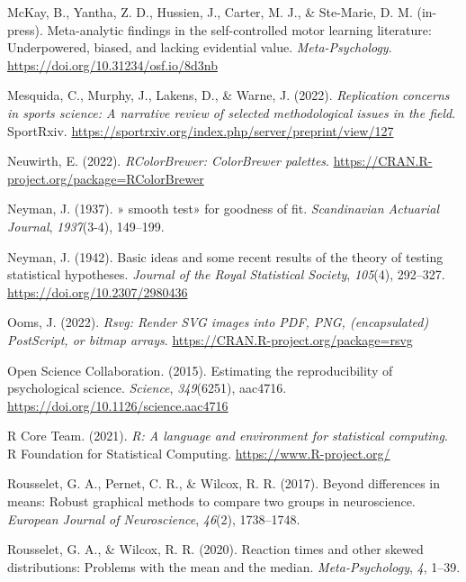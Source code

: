 \documentclass[
  man, donotrepeattitle,mask,floatsintext]{apa7}
\newlength{\cslhangindent}
\newlength{\cslentryspacingunit} %
\newenvironment{CSLReferences}[2] %
 {%
  \setlength{\parindent}{0pt}
  \ifodd #1
  \let\oldpar\par
  \def\par{\hangindent=\cslhangindent\oldpar}
  \fi
  \setlength{\parskip}{#2\cslentryspacingunit}
 }%
 {}
\begin{document}
\begin{CSLReferences}{1}{0}
\leavevmode{}%
McKay, B., Yantha, Z. D., Hussien, J., Carter, M. J., \& Ste-Marie, D. M. (in-press). Meta-analytic findings in the self-controlled motor learning literature: {Underpowered}, biased, and lacking evidential value. \emph{Meta-Psychology}. \url{https://doi.org/10.31234/osf.io/8d3nb}

\leavevmode{}%
Mesquida, C., Murphy, J., Lakens, D., \& Warne, J. (2022). \emph{Replication concerns in sports science: A narrative review of selected methodological issues in the field}. SportRxiv. \url{https://sportrxiv.org/index.php/server/preprint/view/127}

\leavevmode{}%
Neuwirth, E. (2022). \emph{RColorBrewer: ColorBrewer palettes}. \url{https://CRAN.R-project.org/package=RColorBrewer}

\leavevmode{}%
Neyman, J. (1937). » smooth test» for goodness of fit. \emph{Scandinavian Actuarial Journal}, \emph{1937}(3-4), 149--199.

\leavevmode{}%
Neyman, J. (1942). Basic ideas and some recent results of the theory of testing statistical hypotheses. \emph{Journal of the Royal Statistical Society}, \emph{105}(4), 292--327. \url{https://doi.org/10.2307/2980436}

\leavevmode{}%
Ooms, J. (2022). \emph{Rsvg: Render SVG images into PDF, PNG, (encapsulated) PostScript, or bitmap arrays}. \url{https://CRAN.R-project.org/package=rsvg}

\leavevmode{}%
Open Science Collaboration. (2015). Estimating the reproducibility of psychological science. \emph{Science}, \emph{349}(6251), aac4716. \url{https://doi.org/10.1126/science.aac4716}

\leavevmode{}%
R Core Team. (2021). \emph{R: A language and environment for statistical computing}. R Foundation for Statistical Computing. \url{https://www.R-project.org/}

\leavevmode{}%
Rousselet, G. A., Pernet, C. R., \& Wilcox, R. R. (2017). Beyond differences in means: Robust graphical methods to compare two groups in neuroscience. \emph{European Journal of Neuroscience}, \emph{46}(2), 1738--1748.

\leavevmode{}%
Rousselet, G. A., \& Wilcox, R. R. (2020). Reaction times and other skewed distributions: Problems with the mean and the median. \emph{Meta-Psychology}, \emph{4}, 1--39.


\end{CSLReferences}
\end{document}
